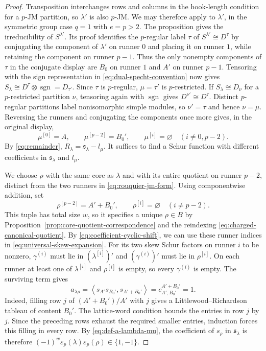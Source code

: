 \documentclass[12pt,reqno,a4paper]{amsart}
\numberwithin{equation}{section}
\numberwithin{figure}{section}
\theoremstyle{plain}
\theoremstyle{definition}
\newcommand{\eps}{\varepsilon}
\newcommand{\inner}[2]{\left\langle #1,#2\right\rangle}
\newcommand{\emptypar}{\varnothing}
\begin{document}
\begin{proof}
Transposition interchanges rows and columns in the hook-length condition
for a $p$-JM partition, so $\lambda'$ is also $p$-JM.  We may therefore
apply \cite[Proposition~4.3 and its proof]{Fayers} to $\lambda'$,
in the symmetric group case $q=1$ with $e=p>2$.  The proposition gives
the irreducibility of $S^{\lambda'}$.  Its proof identifies the
$p$-regular label $\tau$ of $S^{\lambda'}\cong D^\tau$ by conjugating
the component of $\lambda'$ on runner $0$ and placing it on runner $1$,
while retaining the component on runner $p-1$.  Thus the only
nonempty components of $\tau$ in the conjugate
display are $B_0$ on runner $1$ and $A'$ on runner $p-1$.
Tensoring with the sign representation in \eqref{eq:dual-specht-convention}
now gives $S_\lambda\cong D^\tau\otimes\operatorname{sgn}=D_{\tau'}$.
Since $\tau$ is $p$-regular, $\mu=\tau'$ is $p$-restricted.
If $S_\lambda\cong D_\nu$ for a $p$-restricted partition $\nu$, tensoring
again with $\operatorname{sgn}$ gives $D^{\nu'}\cong D^\tau$.
Distinct $p$-regular partitions label nonisomorphic simple modules, so
$\nu'=\tau$ and hence $\nu=\mu$.
Reversing the runners and conjugating the components once more gives,
in the original display,
\begin{equation}\label{eq:mu-quotient}
 \mu^{[0]}=A,\qquad \mu^{[p-2]}=B_0',\qquad
 \mu^{[i]}=\emptypar\quad(i\neq0,p-2).
\end{equation}
By \eqref{eq:remainder}, $R_\lambda=\mathfrak{s}_\lambda-l_\mu$.
It suffices to find a Schur function with different coefficients in
$\mathfrak{s}_\lambda$ and $l_\mu$.

We choose $\rho$ with the same core as $\lambda$ and with its entire
quotient on runner $p-2$, distinct from the two runners in
\eqref{eq:rouquier-jm-form}.  Using componentwise addition, set
\begin{equation}\label{eq:rho-quotient}
 \rho^{[p-2]}=A'+B_0',\qquad
 \rho^{[i]}=\emptypar\quad(i\neq p-2).
\end{equation}
This tuple has total size $w$, so it specifies a unique $\rho\in B$
by Proposition~\ref{prop:core-quotient-correspondence} and the
reindexing \eqref{eq:charged-canonical-quotient}.  By
\eqref{eq:coefficient-cyclic-shift}, we can use these runner indices
in \eqref{eq:universal-skew-expansion}.  For its two skew Schur factors
on runner $i$ to be nonzero, $\gamma^{(i)}$ must lie in
$(\lambda^{[i]})'$ and $(\gamma^{(i)})'$ must lie in $\rho^{[i]}$.
On each runner at least one of $\lambda^{[i]}$ and $\rho^{[i]}$ is
empty, so every $\gamma^{(i)}$ is empty.  The surviving term gives
\begin{equation}\label{eq:nonzero-rho-coefficient}
 a_{\lambda\rho}
 =\inner{s_{A'}s_{B_0'}}{s_{A'+B_0'}}
 =c^{A'+B_0'}_{A',B_0'}=1.
\end{equation}
Indeed, filling row $j$ of $(A'+B_0')/A'$ with $j$ gives a
Littlewood--Richardson tableau of content $B_0'$.  The lattice-word
condition bounds the entries in row $j$ by $j$.  Since the preceding
rows exhaust the required smaller entries, induction forces this
filling in every row.  By \eqref{eq:def-a-lambda-mu}, the coefficient of $s_\rho$
in $\mathfrak{s}_\lambda$ is therefore
$(-1)^w\eps_p(\lambda)\eps_p(\rho)\in\{1,-1\}$.


\end{proof}
\end{document}
